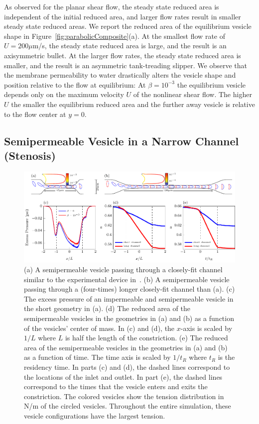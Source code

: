 \documentclass[9pt,twocolumn,twoside,lineno]{pnas-new}
\newif\ifTikz
\begin{document}
As observed for the planar shear flow, the steady state reduced area is
independent of the initial reduced area, and larger flow rates result in
smaller steady state reduced areas. We report the reduced area of the
equilibrium vesicle shape in Figure~\ref{fig:parabolicComposite}(a). At
the smallest flow rate of $U= 200 \mu$m/s, the steady state reduced
area is large, and the result is an axisymmetric bullet. At the larger
flow rates, the steady state reduced area is smaller, and the result is
an asymmetric tank-treading slipper. We observe that the membrane
permeability to water drastically alters the vesicle shape and position
relative to the flow at equilibrium: At $\beta=10^{-3}$ the equilibrium
vesicle depends only on the maximum velocity $U$ of the nonlinear shear
flow. The higher $U$ the smaller the equilibrium reduced area and the
further away vesicle is relative to the flow center at $y=0$. 
 
\subsection*{Semipermeable Vesicle in a Narrow Channel (Stenosis)}
 \begin{figure}[htp]
  \centering
  \ifTikz
  
  \else
  \includegraphics{figures/stenosisComposite.pdf}
  \fi
  \caption{\label{fig:stenosisComposite} (a) A semipermeable vesicle
  passing through a closely-fit channel similar to the experimental
  device in~\cite{abk-fai-sto2006}. (b) A semipermeable vesicle passing
  through a  (four-times) longer closely-fit channel than (a). (c)
  The excess pressure of an impermeable and semipermeable vesicle in the
  short geometry in (a). (d) The reduced area of the semipermeable
   vesicles in the geometries in (a) and (b) as a function of the
   vesicles' center of mass. In (c) and (d), the $x$-axis is scaled by
   $1/L$ where $L$ is half the length of the constriction. (e) The
   reduced area of the semipermeable vesicles in the geometries in (a)
   and (b) as a function of time. The time axis is scaled by $1/t_R$
   where $t_R$ is the residency time. In parts (c) and (d), the dashed
   lines correspond to the locations of the inlet and outlet. In part
   (e), the dashed lines correspond to the times that the vesicle enters
   and exits the constriction. The colored vesicles show the tension
   distribution in N/m of the circled vesicles. Throughout the entire
   simulation, these vesicle configurations have the largest tension.
   }
\end{figure}
\end{document}
